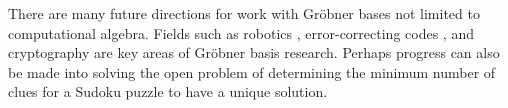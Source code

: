\documentclass[../main.tex]{subfiles}
\begin{document}
    There are many future directions for work with Gr\"obner bases not limited to computational algebra. Fields such as robotics \cite{montes2002new}, error-correcting codes \cite{333885}, and cryptography \cite{faugere2003algebraic} are key areas of Gr\"obner basis research. Perhaps progress can also be made into solving the open problem of determining the minimum number of clues for a Sudoku puzzle to have a unique solution.
\end{document}
